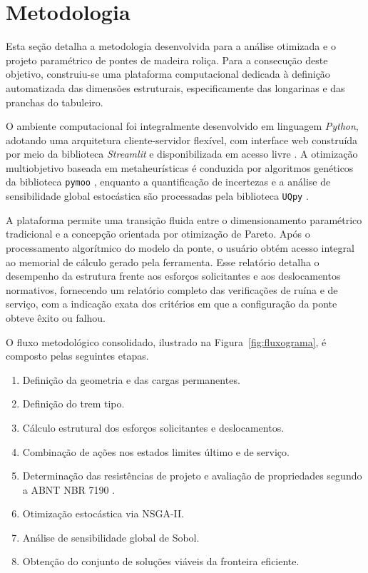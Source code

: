 \section{Metodologia}\label{sec:metodologia}

Esta seção detalha a metodologia desenvolvida para a análise otimizada e o projeto paramétrico de pontes de madeira roliça.
Para a consecução deste objetivo, construiu-se uma plataforma computacional dedicada à definição automatizada das dimensões estruturais, especificamente das longarinas e das pranchas do tabuleiro.

O ambiente computacional foi integralmente desenvolvido em linguagem \textit{Python}, adotando uma arquitetura cliente-servidor flexível, com interface web construída por meio da biblioteca \textit{Streamlit} e disponibilizada em acesso livre \parencite{ReliaBridge2026}.
A otimização multiobjetivo baseada em metaheurísticas é conduzida por algoritmos genéticos da biblioteca \texttt{pymoo} \parencite{blank2020}, enquanto a quantificação de incertezas e a análise de sensibilidade global estocástica são processadas pela biblioteca \texttt{UQpy} \parencite{Olivier2020}.

A plataforma permite uma transição fluida entre o dimensionamento paramétrico tradicional e a concepção orientada por otimização de Pareto.
Após o processamento algorítmico do modelo da ponte, o usuário obtém acesso integral ao memorial de cálculo gerado pela ferramenta.
Esse relatório detalha o desempenho da estrutura frente aos esforços solicitantes e aos deslocamentos normativos, fornecendo um relatório completo das verificações de ruína e de serviço, com a indicação exata dos critérios em que a configuração da ponte obteve êxito ou falhou.

O fluxo metodológico consolidado, ilustrado na Figura~\ref{fig:fluxograma}, é composto pelas seguintes etapas.
\begin{enumerate}[label=(\roman*)]
    \item Definição da geometria e das cargas permanentes.
    \item Definição do trem tipo.
    \item Cálculo estrutural dos esforços solicitantes e deslocamentos.
    \item Combinação de ações nos estados limites último e de serviço.
    \item Determinação das resistências de projeto e avaliação de propriedades segundo a ABNT NBR 7190 \parencite{NBR7190-1:2022}.
    \item Otimização estocástica via NSGA-II.
    \item Análise de sensibilidade global de Sobol.
    \item Obtenção do conjunto de soluções viáveis da fronteira eficiente.
\end{enumerate}

